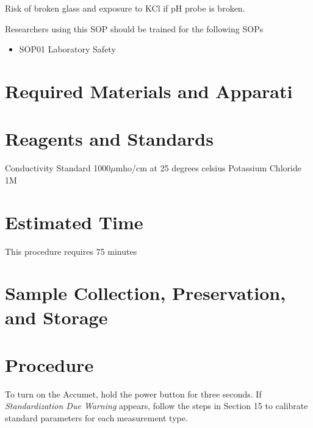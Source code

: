 \documentclass[12pt]{../SOP3}\usepackage[]{graphicx}\usepackage[]{xcolor}
\begin{document}
\NP Risk of broken glass and exposure to KCl if pH probe is broken.



\NP Researchers using this SOP should be trained for the following SOPs

\begin{itemize}
  \item SOP01 Laboratory Safety
\end{itemize}

\section{Required Materials and Apparati}



\section{Reagents and Standards}

\NP Conductivity Standard 1000$\mu$mho/cm at 25 degrees celsius 
\NP Potassium Chloride 1M 

\section{Estimated Time}

\NP This procedure requires 75 minutes

\section{Sample Collection, Preservation, and Storage}

\section{Procedure}

\NP To turn on the Accumet, hold the power button for three seconds.
\NP If \emph{Standardization Due Warning} appears, follow the steps in Section 15 to calibrate standard parameters for each measurement type.
\end{document}
